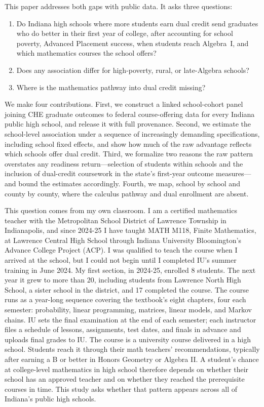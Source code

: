 \documentclass[aps,prd,reprint,superscriptaddress,nofootinbib,floatfix]{revtex4-2}
\begin{document}
This paper addresses both gaps with public data. It asks three questions:
\begin{enumerate}
\item Do Indiana high schools where more students earn dual credit send graduates who do better in their first year of college, after accounting for school poverty, Advanced Placement success, when students reach Algebra~I, and which mathematics courses the school offers?
\item Does any association differ for high-poverty, rural, or late-Algebra schools?
\item Where is the mathematics pathway into dual credit missing?
\end{enumerate}

We make four contributions. First, we construct a linked school-cohort panel joining CHE graduate outcomes to federal course-offering data for every Indiana public high school, and release it with full provenance. Second, we estimate the school-level association under a sequence of increasingly demanding specifications, including school fixed effects, and show how much of the raw advantage reflects which schools offer dual credit. Third, we formalize two reasons the raw pattern overstates any readiness return---selection of students within schools and the inclusion of dual-credit coursework in the state's first-year outcome measures---and bound the estimates accordingly. Fourth, we map, school by school and county by county, where the calculus pathway and dual enrollment are absent.

This question comes from my own classroom. I am a certified mathematics teacher with the Metropolitan School District of Lawrence Township in Indianapolis, and since 2024-25 I have taught MATH M118, Finite Mathematics, at Lawrence Central High School through Indiana University Bloomington's Advance College Project (ACP). I was qualified to teach the course when I arrived at the school, but I could not begin until I completed IU's summer training in June 2024. My first section, in 2024-25, enrolled 8 students. The next year it grew to more than 20, including students from Lawrence North High School, a sister school in the district, and 17 completed the course. The course runs as a year-long sequence covering the textbook's eight chapters, four each semester: probability, linear programming, matrices, linear models, and Markov chains. IU sets the final examination at the end of each semester; each instructor files a schedule of lessons, assignments, test dates, and finals in advance and uploads final grades to IU. The course is a university course delivered in a high school. Students reach it through their math teachers' recommendations, typically after earning a B or better in Honors Geometry or Algebra II. A student's chance at college-level mathematics in high school therefore depends on whether their school has an approved teacher and on whether they reached the prerequisite courses in time. This study asks whether that pattern appears across all of Indiana's public high schools.
\end{document}
